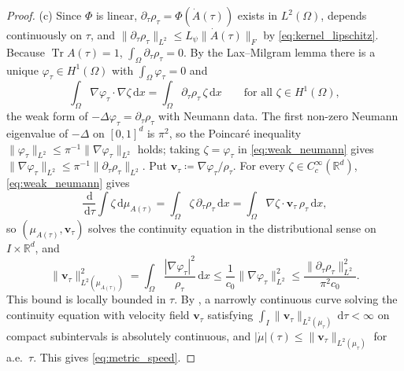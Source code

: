 \documentclass[11pt,a4paper,reqno]{amsart}
\theoremstyle{definition}
\numberwithin{equation}{section}
\newcommand{\R}{\mathbb{R}}
\newcommand{\Tr}{\operatorname{Tr}}
\newcommand{\dif}{\,\mathrm{d}}
\begin{document}
\begin{proof}
(c) Since $\Phi$ is linear, $\partial_\tau \rho_\tau = \Phi(\dot{A}(\tau))$ exists in $L^2(\Omega)$, depends continuously on $\tau$, and $\|\partial_\tau \rho_\tau\|_{L^2} \le L_\psi \|\dot{A}(\tau)\|_F$ by \eqref{eq:kernel_lipschitz}. Because $\Tr A(\tau) = 1$, $\int_\Omega \partial_\tau \rho_\tau = 0$. By the Lax--Milgram lemma there is a unique $\varphi_\tau \in H^1(\Omega)$ with $\int_\Omega \varphi_\tau = 0$ and
\begin{equation}
    \int_\Omega \nabla \varphi_\tau \cdot \nabla \zeta \dif x = \int_\Omega \partial_\tau \rho_\tau \, \zeta \dif x \qquad \text{for all } \zeta \in H^1(\Omega),
    \label{eq:weak_neumann}
\end{equation}
the weak form of $-\Delta \varphi_\tau = \partial_\tau\rho_\tau$ with Neumann data. The first non-zero Neumann eigenvalue of $-\Delta$ on $[0,1]^d$ is $\pi^2$, so the Poincar\'e inequality $\|\varphi_\tau\|_{L^2} \le \pi^{-1} \|\nabla \varphi_\tau\|_{L^2}$ holds; taking $\zeta = \varphi_\tau$ in \eqref{eq:weak_neumann} gives $\|\nabla \varphi_\tau\|_{L^2} \le \pi^{-1}\|\partial_\tau \rho_\tau\|_{L^2}$. Put $\mathbf{v}_\tau \coloneqq \nabla \varphi_\tau / \rho_\tau$. For every $\zeta \in C_c^\infty(\R^d)$, \eqref{eq:weak_neumann} gives
\begin{equation}
    \frac{\dif}{\dif \tau} \int \zeta \dif \mu_{A(\tau)} = \int_\Omega \zeta \, \partial_\tau \rho_\tau \dif x = \int_\Omega \nabla \zeta \cdot \mathbf{v}_\tau \, \rho_\tau \dif x,
\end{equation}
so $(\mu_{A(\tau)}, \mathbf{v}_\tau)$ solves the continuity equation in the distributional sense on $I \times \R^d$, and
\begin{equation}
    \|\mathbf{v}_\tau\|_{L^2(\mu_{A(\tau)})}^2 = \int_\Omega \frac{|\nabla \varphi_\tau|^2}{\rho_\tau} \dif x \le \frac{1}{c_0} \|\nabla \varphi_\tau\|_{L^2}^2 \le \frac{\|\partial_\tau \rho_\tau\|_{L^2}^2}{\pi^2 c_0}.
\end{equation}
This bound is locally bounded in $\tau$. By \cite[Thm.~8.3.1]{ambrosio2008gradient}, a narrowly continuous curve solving the continuity equation with velocity field $\mathbf{v}_\tau$ satisfying $\int_I \|\mathbf{v}_\tau\|_{L^2(\mu_\tau)} \dif\tau < \infty$ on compact subintervals is absolutely continuous, and $|\dot{\mu}|(\tau) \le \|\mathbf{v}_\tau\|_{L^2(\mu_\tau)}$ for a.e.\ $\tau$. This gives \eqref{eq:metric_speed}.
\end{proof}
\end{document}
